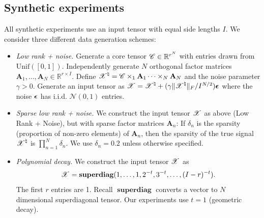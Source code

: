 \subsection{Synthetic experiments}\label{s-synthetic-data}
All synthetic experiments use an input tensor with equal side lengths $I$.
We consider three different data generation schemes:
\begin{itemize}
\item \emph{Low rank + noise.} Generate a core tensor $\T{C} \in \mathbb{R}^{r^N}$ with entries drawn from $\mathrm{Unif}([0,1])$.
  Independently generate $N$ orthogonal factor matrices
  $\mathbf{A}_1, \dots, \mathbf{A}_N \in \mathbb{R}^{r \times I}$.
	Define $\T{X}^\natural = \T{C} \times_1 \mathbf{A}_1 \cdots \times_N \mathbf{A}_N$
	and the noise parameter $\gamma > 0$.
	Generate an input tensor as
	$\T{X} = \T{X}^\natural + (\gamma \|\T{X}^\natural\|_F / I^{N/2})\T{\epsilon}$
	where the noise $\T{\epsilon}$ has i.i.d. $\mathcal{N}(0,1)$ entries.
\item \emph{Sparse low rank + noise.} We construct the input tensor $\T{X}$ as above (Low Rank + Noise),
but with sparse factor matrices $\mathbf{A}_n$:
If $\delta_n$ is the sparsity (proportion of non-zero elements) of $\mathbf{A}_n$,
then the sparsity of the true signal $\T{X}^\natural$ is $\prod_{n=1}^N \delta_n$.
We use $\delta_n = 0.2$ unless otherwise specified.
\item \emph{Polynomial decay.} We construct the input tensor $\T{X}$ as
  \begin{equation*}
      \T{X} = \mathop{\textbf{superdiag}}(1,\dots,1, 2^{-t},3^{-t},\dots, (I-r)^{-t}).
  \end{equation*}
  The first $r$ entries are 1.
	Recall $\mathop{\textbf{superdiag}}$ converts a vector to $N$ dimensional superdiagonal tensor.
  Our experiments use $t = 1$ (geometric decay).
\end{itemize}

